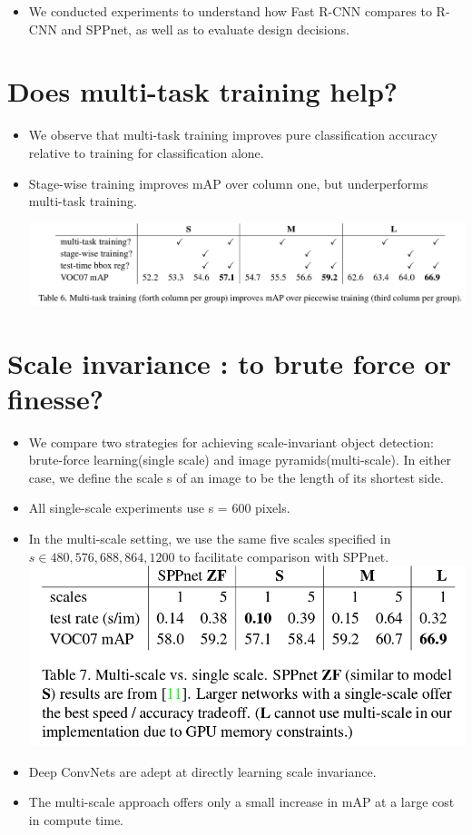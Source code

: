 \documentclass[11pt]{book}
\begin{document}
\begin{itemize}
\item We conducted experiments to understand how Fast R-CNN compares to R-CNN and SPPnet, as well 
     as to evaluate design decisions.
\end{itemize}
   
\section{Does multi-task training help?}
\label{sec-1-4-1}


\begin{itemize}
\item We observe that multi-task training improves pure classification accuracy relative to
      training for classification alone.
\item Stage-wise training improves mAP over column one, but underperforms multi-task training.
    
      \includegraphics[width=.9\linewidth]{./pic_fast_rcnn/table6.png}
\end{itemize}
\section{Scale invariance : to brute force or finesse?}
\label{sec-1-4-2}


\begin{itemize}
\item We compare two strategies for achieving scale-invariant object detection:
      brute-force learning(single scale) and image pyramids(multi-scale). In either
      case, we define the scale s of an image to be the length of its shortest side.
\item All single-scale experiments use s = 600 pixels.
\item In the multi-scale setting, we use the same five scales specified in \footnotemark[4]
      $s\in{{480,576,688,864,1200}}$ to facilitate comparison with SPPnet.
      \includegraphics[width=.9\linewidth]{./pic_fast_rcnn/table7.png}
\item Deep ConvNets are adept at directly learning scale invariance.
\item The multi-scale approach offers only a small increase in mAP at a large cost
      in compute time.
\end{itemize}
\end{document}
